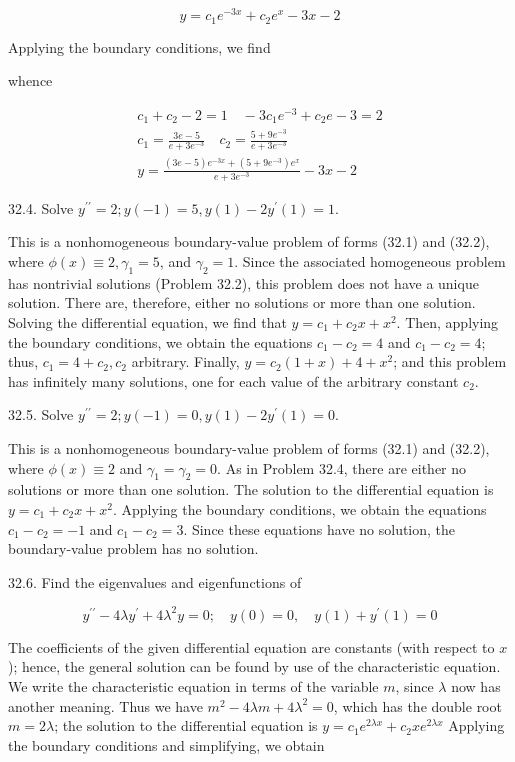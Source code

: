 \documentclass[10pt]{article}
\begin{document}
$$
y=c_{1} e^{-3 x}+c_{2} e^{x}-3 x-2
$$

Applying the boundary conditions, we find

whence

$$
\begin{gathered}
c_{1}+c_{2}-2=1 \quad-3 c_{1} e^{-3}+c_{2} e-3=2 \\
c_{1}=\frac{3 e-5}{e+3 e^{-3}} \quad c_{2}=\frac{5+9 e^{-3}}{e+3 e^{-3}} \\
y=\frac{(3 e-5) e^{-3 x}+\left(5+9 e^{-3}\right) e^{x}}{e+3 e^{-3}}-3 x-2
\end{gathered}
$$

32.4. Solve $y^{\prime \prime}=2 ; y(-1)=5, y(1)-2 y^{\prime}(1)=1$.

This is a nonhomogeneous boundary-value problem of forms (32.1) and (32.2), where $\phi(x) \equiv 2, \gamma_{1}=5$, and $\gamma_{2}=1$. Since the associated homogeneous problem has nontrivial solutions (Problem 32.2), this problem does not have a unique solution. There are, therefore, either no solutions or more than one solution. Solving the differential equation, we find that $y=c_{1}+c_{2} x+x^{2}$. Then, applying the boundary conditions, we obtain the equations $c_{1}-c_{2}=4$ and $c_{1}-c_{2}=4$; thus, $c_{1}=4+c_{2}, c_{2}$ arbitrary. Finally, $y=c_{2}(1+x)+4+x^{2}$; and this problem has infinitely many solutions, one for each value of the arbitrary constant $c_{2}$.

32.5. Solve $y^{\prime \prime}=2 ; y(-1)=0, y(1)-2 y^{\prime}(1)=0$.

This is a nonhomogeneous boundary-value problem of forms (32.1) and (32.2), where $\phi(x) \equiv 2$ and $\gamma_{1}=\gamma_{2}=0$. As in Problem 32.4, there are either no solutions or more than one solution. The solution to the differential equation is $y=c_{1}+c_{2} x+x^{2}$. Applying the boundary conditions, we obtain the equations $c_{1}-c_{2}=-1$ and $c_{1}-c_{2}=3$. Since these equations have no solution, the boundary-value problem has no solution.

32.6. Find the eigenvalues and eigenfunctions of

$$
y^{\prime \prime}-4 \lambda y^{\prime}+4 \lambda^{2} y=0 ; \quad y(0)=0, \quad y(1)+y^{\prime}(1)=0
$$

The coefficients of the given differential equation are constants (with respect to $x$ ); hence, the general solution can be found by use of the characteristic equation. We write the characteristic equation in terms of the variable $m$, since $\lambda$ now has another meaning. Thus we have $m^{2}-4 \lambda m+4 \lambda^{2}=0$, which has the double root $m=2 \lambda$; the solution to the differential equation is $y=c_{1} e^{2 \lambda x}+c_{2} x e^{2 \lambda x}$ Applying the boundary conditions and simplifying, we obtain
\end{document}
